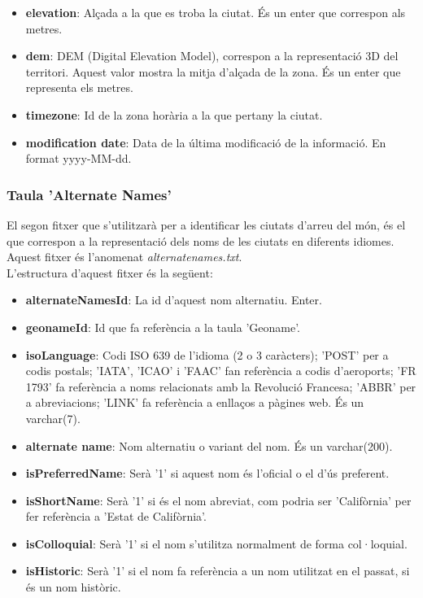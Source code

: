 \documentclass[12pt,a4paper,openright,oneside]{article}
\numberwithin{equation}{section}
\theoremstyle{definition}
\begin{document}
\begin{itemize}
\item \textbf{elevation}: Alçada a la que es troba la ciutat. És un enter que correspon als metres.
\item \textbf{dem}: DEM (Digital Elevation Model), correspon a la representació 3D del territori. Aquest valor mostra la mitja d'alçada de la zona. És un enter que representa els metres.
\item \textbf{timezone}: Id de la zona horària a la que pertany la ciutat.
\item \textbf{modification date}: Data de la última modificació de la informació. En format yyyy-MM-dd.
\end{itemize}

\subsubsection*{Taula 'Alternate Names'}
El segon fitxer que s'utilitzarà per a identificar les ciutats d'arreu del món, és el que correspon a la representació dels noms de les ciutats en diferents idiomes. Aquest fitxer és l'anomenat \emph{alternatenames.txt}.\\
L'estructura d'aquest fitxer és la següent:
\begin{itemize}
\item \textbf{alternateNamesId}: La id d'aquest nom alternatiu. Enter.
\item \textbf{geonameId}: Id que fa referència a la taula 'Geoname'.
\item \textbf{isoLanguage}: Codi ISO 639 de l'idioma (2 o 3 caràcters); 'POST' per a codis postals; 'IATA', 'ICAO' i 'FAAC' fan referència a codis d'aeroports; 'FR 1793' fa referència a noms relacionats amb la Revolució Francesa; 'ABBR' per a abreviacions; 'LINK' fa referència a enllaços a pàgines web. És un varchar(7).
\item \textbf{alternate name}: Nom alternatiu o variant del nom. És un varchar(200).
\item \textbf{isPreferredName}: Serà '1' si aquest nom és l'oficial o el d'ús preferent.
\item \textbf{isShortName}: Serà '1' si és el nom abreviat, com podria ser 'Califòrnia' per fer referència a 'Estat de Califòrnia'.
\item \textbf{isColloquial}: Serà '1' si el nom s'utilitza normalment de forma col·loquial.
\item \textbf{isHistoric}: Serà '1' si el nom fa referència a un nom utilitzat en el passat, si és un nom històric.
\end{itemize}
\end{document}
